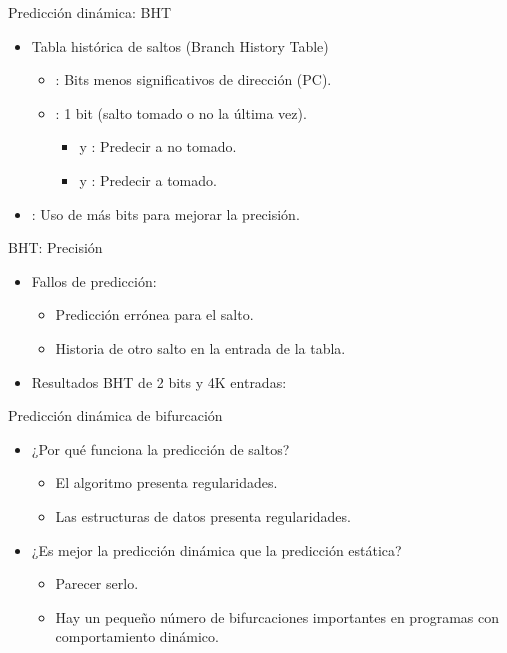 \begin{frame}[t]{Predicción dinámica: BHT}
\begin{itemize}
  \item Tabla histórica de saltos (Branch History Table)
    \begin{itemize}
      \item {}: Bits menos significativos de dirección (PC).
      \item {}: 1 bit (salto tomado o no la última vez).
        \begin{itemize}
          \item {} y : Predecir a no tomado.
          \item {} y : Predecir a tomado.
        \end{itemize}
    \end{itemize}
\end{itemize}
\makebox[\textwidth][c]{

}
\begin{itemize}
  \item {}: Uso de más bits para mejorar la precisión.
\end{itemize}
\end{frame}

\begin{frame}[t,shrink=10]{BHT: Precisión}
\begin{itemize}
  \item Fallos de predicción:
    \begin{itemize}
      \item Predicción errónea para el salto.
      \item Historia de otro salto en la entrada de la tabla.
    \end{itemize}
\item Resultados BHT de 2 bits y 4K entradas:
\end{itemize}

\end{frame}

\begin{frame}[t]{Predicción dinámica de bifurcación}
\begin{itemize}
  \item ¿Por qué funciona la predicción de saltos?
    \begin{itemize}
      \item El algoritmo presenta regularidades.
      \item Las estructuras de datos presenta regularidades.
    \end{itemize}

  \item ¿Es mejor la predicción dinámica que la predicción estática?
    \begin{itemize}
      \item Parecer serlo.
      \item Hay un pequeño número de bifurcaciones importantes en programas con comportamiento dinámico.
    \end{itemize}
\end{itemize}
\end{frame}
